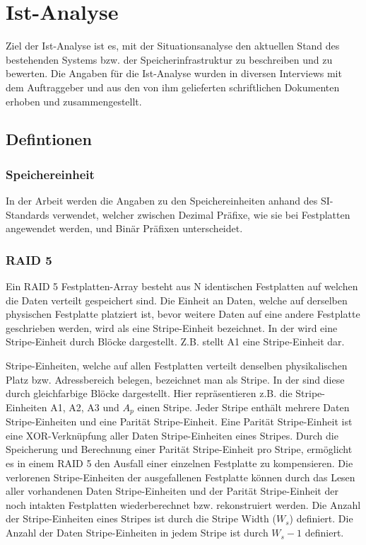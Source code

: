 
\cleardoublepage
\chapter{Ist-Analyse}
Ziel der Ist-Analyse ist es, mit der Situationsanalyse den aktuellen Stand des bestehenden Systems bzw. der Speicherinfrastruktur zu beschreiben und zu bewerten.
Die Angaben für die Ist-Analyse wurden in diversen Interviews mit dem Auftraggeber und aus den von ihm gelieferten schriftlichen Dokumenten erhoben und zusammengestellt.

\section{Defintionen}

\subsection{Speichereinheit}
In der Arbeit werden die Angaben zu den Speichereinheiten anhand des SI-Standards \cite{Technology1998} verwendet, welcher zwischen Dezimal Präfixe, wie sie bei Festplatten angewendet werden, und Binär Präfixen unterscheidet.

\subsection{RAID 5}\label{RAID 5}

Ein RAID 5 Festplatten-Array besteht aus N identischen Festplatten auf welchen die Daten verteilt gespeichert sind. Die Einheit an Daten, welche auf derselben physischen Festplatte platziert ist, bevor weitere Daten auf eine andere Festplatte geschrieben werden, wird als eine Stripe-Einheit bezeichnet.
In der  wird eine Stripe-Einheit durch Blöcke dargestellt. Z.B. stellt A1 eine Stripe-Einheit dar. \cite{Kuratti1995}

Stripe-Einheiten, welche auf allen Festplatten verteilt denselben physikalischen Platz bzw. Adressbereich belegen, bezeichnet man als Stripe. In der  sind diese durch gleichfarbige Blöcke dargestellt. Hier repräsentieren z.B. die Stripe-Einheiten A1, A2, A3 und $A_{p}$ einen Stripe.
Jeder Stripe enthält mehrere Daten Stripe-Einheiten und eine Parität Stripe-Einheit. Eine Parität Stripe-Einheit ist eine XOR-Verknüpfung aller Daten Stripe-Einheiten eines Stripes. Durch die Speicherung und Berechnung einer Parität Stripe-Einheit pro Stripe, ermöglicht es in einem RAID 5 den Ausfall einer einzelnen Festplatte zu kompensieren. Die verlorenen Stripe-Einheiten der ausgefallenen Festplatte können durch das Lesen aller vorhandenen Daten Stripe-Einheiten und der Parität Stripe-Einheit der noch intakten Festplatten wiederberechnet bzw. rekonstruiert werden. Die Anzahl der Stripe-Einheiten eines Stripes ist durch die Stripe Width  ($W_{s}$) definiert. Die Anzahl der Daten Stripe-Einheiten in jedem Stripe ist durch $W_{s} -1$ definiert. \cite{Kuratti1995}

